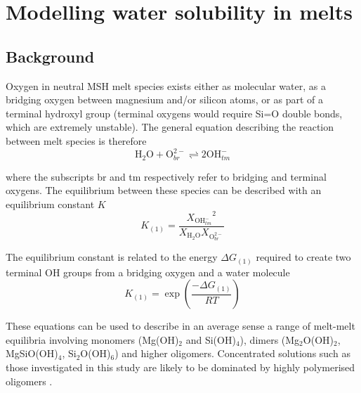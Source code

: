 \documentclass[review]{elsarticle}
\begin{document}
\section{Modelling water solubility in melts}
\subsection{Background}
Oxygen in neutral MSH melt species exists either as molecular water, as a bridging oxygen between magnesium and/or silicon atoms, or as part of a terminal hydroxyl group (terminal oxygens would require Si=O double bonds, which are extremely unstable). The general equation describing the reaction between melt species is therefore
\begin{equation}
\textrm{H}_2\textrm{O} + \textrm{O}_{br}^{2-} \rightleftharpoons 2 \textrm{OH}_{tm}^-
\label{eqn:speciation}
\end{equation}

where the subscripts br and tm respectively refer to bridging and terminal oxygens. The equilibrium between these species can be described with an equilibrium constant $K$ \cite[e.g.][]{Stolper1982}
\begin{equation}
K_{(1)} = \frac{{X_{\textrm{OH}_{tm}^-}}^2}{X_{\textrm{H}_2\textrm{O}} X_{\textrm{O}_{br}^{2-}} }
\label{eqn:equilibrium_constant}
\end{equation}

The equilibrium constant is related to the energy $\Delta G_{(1)}$ required to create two terminal OH groups from a bridging oxygen and a water molecule
\begin{equation}
K_{(1)} = \exp\left(\frac{-\Delta G_{(1)}}{RT}\right)
\end{equation}

These equations can be used to describe in an average sense a range of melt-melt equilibria involving monomers (Mg(OH)$_2$ and Si(OH)$_4$), dimers (Mg$_2$O(OH)$_2$, MgSiO(OH)$_4$, Si$_2$O(OH)$_6$) and higher oligomers. Concentrated solutions such as those investigated in this study are likely to be dominated by highly polymerised oligomers \citep[see][]{HM2012}.
\end{document}
